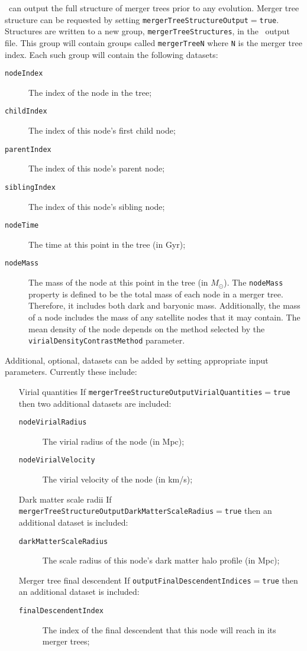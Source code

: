 \glc\ can output the full structure of merger trees prior to any evolution. Merger tree structure can be requested by setting {\tt mergerTreeStructureOutput}$=${\tt true}. Structures are written to a new group, {\tt mergerTreeStructures}, in the \glc\ output file. This group will contain groups called {\tt mergerTreeN} where {\tt N} is the merger tree index. Each such group will contain the following datasets:
\begin{description}
 \item [{\tt nodeIndex}] The index of the node in the tree;
 \item [{\tt childIndex}] The index of this node's first child node;
 \item [{\tt parentIndex}] The index of this node's parent node;
 \item [{\tt siblingIndex}] The index of this node's sibling node;
 \item [{\tt nodeTime}] The time at this point in the tree (in Gyr);
 \item [{\tt nodeMass}] The mass of the node at this point in the tree (in $M_\odot$). The {\tt nodeMass} property is defined to be the total mass of each node in a merger tree. Therefore, it includes both dark and baryonic mass. Additionally, the mass of a node includes the mass of any satellite nodes that it may contain. The mean density of the node depends on the method selected by the {\tt virialDensityContrastMethod} parameter.
\end{description}
Additional, optional, datasets can be added by setting appropriate input parameters. Currently these include:
\begin{itemize}
 \item [Virial quantities] If {\tt mergerTreeStructureOutputVirialQuantities}$=${\tt true} then two additional datasets are included:
 \begin{description}
  \item [{\tt nodeVirialRadius}] The virial radius of the node (in Mpc);
  \item [{\tt nodeVirialVelocity}] The virial velocity of the node (in km/s);
 \end{description}
 \item [Dark matter scale radii] If {\tt mergerTreeStructureOutputDarkMatterScaleRadius}$=${\tt true} then an additional dataset is included:
 \begin{description}
  \item [{\tt darkMatterScaleRadius}] The scale radius of this node's dark matter halo profile (in Mpc);
 \end{description}
 \item [Merger tree final descendent] If {\tt outputFinalDescendentIndices}$=${\tt true} then an additional dataset is included:
 \begin{description}
  \item [{\tt finalDescendentIndex}] The index of the final descendent that this node will reach in its merger trees;
 \end{description}
\end{itemize}

